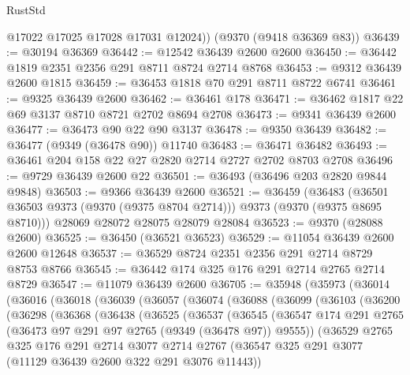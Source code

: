 \begin{lexlean}{RustStd}
\begin{coremodule}
        @17022
        @17025
        @17028
        @17031
        @12024))
    (@9370 (@9418 @36369 @83))
@36439 := @30194 @36369
@36442 := @12542 @36439 @2600 @2600
@36450 := @36442 @1819 @2351 @2356 @291 @8711 @8724 @2714 @8768
@36453 := @9312 @36439 @2600 @1815
@36459 := @36453 @1818 @70 @291 @8711 @8722 @6741
@36461 := @9325 @36439 @2600
@36462 := @36461 @178
@36471 := @36462 @1817 @22 @69 @3137 @8710 @8721 @2702 @8694 @2708
@36473 := @9341 @36439 @2600
@36477 := @36473 @90 @22 @90 @3137
@36478 := @9350 @36439
@36482 := @36477 (@9349 (@36478 @90)) @11740
@36483 := @36471 @36482
@36493 := @36461 @204 @158 @22 @27 @2820 @2714 @2727 @2702 @8703 @2708
@36496 := @9729 @36439 @2600 @22
@36501 := @36493 (@36496 @203 @2820 @9844 @9848)
@36503 := @9366 @36439 @2600
@36521 := @36459
    (@36483 (@36501 @36503 @9373 (@9370 (@9375 @8704 @2714))) @9373 (@9370 (@9375 @8695 @8710)))
    @28069
    @28072
    @28075
    @28079
    @28084
@36523 := @9370 (@28088 @2600)
@36525 := @36450 (@36521 @36523)
@36529 := @11054 @36439 @2600 @2600 @12648
@36537 := @36529 @8724 @2351 @2356 @291 @2714 @8729 @8753 @8766
@36545 := @36442 @174 @325 @176 @291 @2714 @2765 @2714 @8729
@36547 := @11079 @36439 @2600
@36705 := @35948
    (@35973
      (@36014
        (@36016
          (@36018
            (@36039
              (@36057
                (@36074
                  (@36088
                    (@36099
                      (@36103
                        (@36200
                          (@36298
                            (@36368
                              (@36438
                                (@36525
                                  (@36537
                                    (@36545
                                      (@36547
                                        @174
                                        @291
                                        @2765
                                        (@36473 @97 @291 @97 @2765 (@9349 (@36478 @97)) @9555))
                                      (@36529
                                        @2765
                                        @325
                                        @176
                                        @291
                                        @2714
                                        @3077
                                        @2714
                                        @2767
                                        (@36547
                                          @325
                                          @291
                                          @3077
                                          (@11129 @36439 @2600 @322 @291 @3076 @11443))

\end{coremodule}
\end{lexlean}
